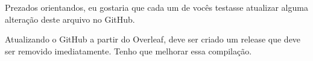 \documentclass{article}
\begin{document}
Prezados orientandos,
eu gostaria que cada um de vocês testasse atualizar alguma alteração deste arquivo no GitHub.

Atualizando o GitHub a partir do Overleaf, deve ser criado um release que deve ser removido imediatamente.
Tenho que melhorar essa compilação.
\end{document}
